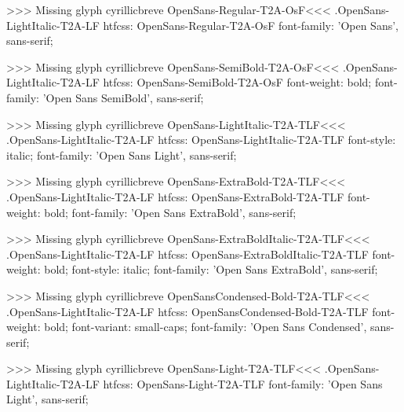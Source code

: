 >>>
Missing glyph	cyrillicbreve
\<OpenSans-Regular-T2A-OsF\><<<
.OpenSans-LightItalic-T2A-LF
htfcss:  OpenSans-Regular-T2A-OsF  font-family: 'Open Sans', sans-serif;

>>>
Missing glyph	cyrillicbreve
\<OpenSans-SemiBold-T2A-OsF\><<<
.OpenSans-LightItalic-T2A-LF
htfcss:  OpenSans-SemiBold-T2A-OsF  font-weight: bold; font-family: 'Open Sans SemiBold', sans-serif;

>>>
Missing glyph	cyrillicbreve
\<OpenSans-LightItalic-T2A-TLF\><<<
.OpenSans-LightItalic-T2A-LF
htfcss:  OpenSans-LightItalic-T2A-TLF  font-style: italic; font-family: 'Open Sans Light', sans-serif;

>>>
Missing glyph	cyrillicbreve
\<OpenSans-ExtraBold-T2A-TLF\><<<
.OpenSans-LightItalic-T2A-LF
htfcss:  OpenSans-ExtraBold-T2A-TLF  font-weight: bold; font-family: 'Open Sans ExtraBold', sans-serif;

>>>
Missing glyph	cyrillicbreve
\<OpenSans-ExtraBoldItalic-T2A-TLF\><<<
.OpenSans-LightItalic-T2A-LF
htfcss:  OpenSans-ExtraBoldItalic-T2A-TLF  font-weight: bold; font-style: italic; font-family: 'Open Sans ExtraBold', sans-serif;

>>>
Missing glyph	cyrillicbreve
\<OpenSansCondensed-Bold-T2A-TLF\><<<
.OpenSans-LightItalic-T2A-LF
htfcss:  OpenSansCondensed-Bold-T2A-TLF  font-weight: bold; font-variant: small-caps; font-family: 'Open Sans Condensed', sans-serif;

>>>
Missing glyph	cyrillicbreve
\<OpenSans-Light-T2A-TLF\><<<
.OpenSans-LightItalic-T2A-LF
htfcss:  OpenSans-Light-T2A-TLF  font-family: 'Open Sans Light', sans-serif;

